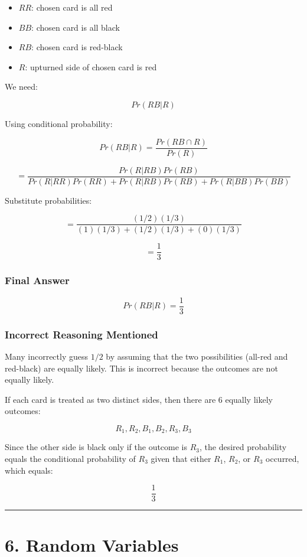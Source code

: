 \documentclass[12pt]{article}
\begin{document}
\begin{itemize}
    \item $RR$: chosen card is all red
    \item $BB$: chosen card is all black
    \item $RB$: chosen card is red-black
    \item $R$: upturned side of chosen card is red
\end{itemize}

We need:

\[
Pr(RB|R)
\]

Using conditional probability:

\[
Pr(RB|R) = \frac{Pr(RB \cap R)}{Pr(R)}
\]

\[
= \frac{Pr(R|RB)Pr(RB)}{Pr(R|RR)Pr(RR) + Pr(R|RB)Pr(RB) + Pr(R|BB)Pr(BB)}
\]

Substitute probabilities:

\[
= \frac{(1/2)(1/3)}{(1)(1/3) + (1/2)(1/3) + (0)(1/3)}
\]

\[
= \frac{1}{3}
\]

\subsubsection*{\textbf{Final Answer}}

\[
Pr(RB|R) = \frac{1}{3}
\]

\subsubsection*{\textbf{Incorrect Reasoning Mentioned}}

Many incorrectly guess $1/2$ by assuming that the two possibilities (all-red and red-black) are equally likely. This is incorrect because the outcomes are not equally likely.

If each card is treated as two distinct sides, then there are 6 equally likely outcomes:

\[
R_1, R_2, B_1, B_2, R_3, B_3
\]

Since the other side is black only if the outcome is $R_3$, the desired probability equals the conditional probability of $R_3$ given that either $R_1$, $R_2$, or $R_3$ occurred, which equals:

\[
\frac{1}{3}
\]

\hrule
\vspace{1em}

\section*{\textbf{6. Random Variables}}
\end{document}
